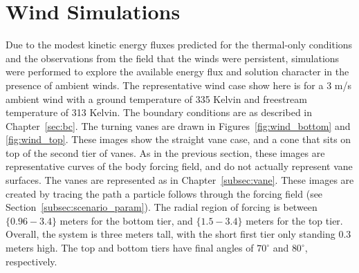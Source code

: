 





\section{Wind Simulations}
\label{sec:wind}

Due to the modest kinetic energy fluxes predicted for the 
thermal-only conditions and the observations from the field that the 
winds were persistent, simulations were performed to explore the
available energy flux and solution character in the presence of ambient
winds. 
The representative wind case show here is for a 3 m/s ambient wind with
a ground temperature of 335 Kelvin and freestream temperature of 313
Kelvin. The boundary conditions are as
described in Chapter~\ref{sec:bc}. The turning vanes are drawn in
Figures~\ref{fig:wind_bottom} and \ref{fig:wind_top}. These images show
the straight vane case, and a cone that sits on top of the second tier of vanes. 
As in the previous section, these images are representative
curves of the body forcing field, and do not actually represent vane
surfaces. The vanes are represented as in Chapter~\ref{subsec:vane}. 
These images are created by tracing the path a particle follows through
the forcing field (see Section~\ref{subsec:scenario_param}). The radial 
region of forcing is between $\{0.96-3.4\}$ meters 
for the bottom tier, and $\{1.5-3.4\}$ meters for the top tier. Overall,
the system is three meters tall, with the short first tier only standing
0.3 meters high. The top and bottom tiers have final angles of
$70^{\circ}$ and $80^{\circ}$, respectively.

